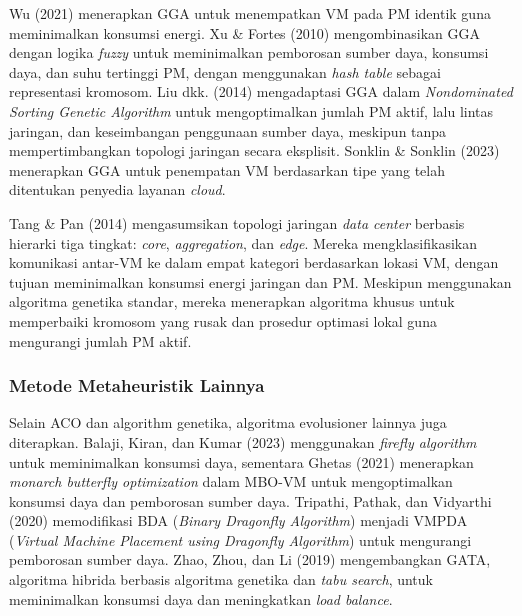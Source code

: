 Wu (2021) menerapkan GGA untuk menempatkan VM pada PM identik guna meminimalkan konsumsi energi. Xu & Fortes (2010) mengombinasikan GGA dengan logika \textit{fuzzy} untuk meminimalkan pemborosan sumber daya, konsumsi daya, dan suhu tertinggi PM, dengan menggunakan \textit{hash table} sebagai representasi kromosom. Liu dkk. (2014) mengadaptasi GGA dalam \textit{Nondominated Sorting Genetic Algorithm} untuk mengoptimalkan jumlah PM aktif, lalu lintas jaringan, dan keseimbangan penggunaan sumber daya, meskipun tanpa mempertimbangkan topologi jaringan secara eksplisit. Sonklin & Sonklin (2023) menerapkan GGA untuk penempatan VM berdasarkan tipe yang telah ditentukan penyedia layanan \textit{cloud}.

Tang & Pan (2014) mengasumsikan topologi jaringan \textit{data center} berbasis hierarki tiga tingkat: \textit{core}, \textit{aggregation}, dan \textit{edge}. Mereka mengklasifikasikan komunikasi antar-VM ke dalam empat kategori berdasarkan lokasi VM, dengan tujuan meminimalkan konsumsi energi jaringan dan PM. Meskipun menggunakan algoritma genetika standar, mereka menerapkan algoritma khusus untuk memperbaiki kromosom yang rusak dan prosedur optimasi lokal guna mengurangi jumlah PM aktif.

\subsubsection{Metode Metaheuristik Lainnya}
Selain ACO dan algorithm genetika, algoritma evolusioner lainnya juga diterapkan. Balaji, Kiran, dan Kumar (2023) menggunakan \textit{firefly algorithm} untuk meminimalkan konsumsi daya, sementara Ghetas (2021) menerapkan \textit{monarch butterfly optimization} dalam MBO-VM untuk mengoptimalkan konsumsi daya dan pemborosan sumber daya. Tripathi, Pathak, dan Vidyarthi (2020) memodifikasi BDA (\textit{Binary Dragonfly Algorithm}) menjadi VMPDA (\textit{Virtual Machine Placement using Dragonfly Algorithm}) untuk mengurangi pemborosan sumber daya. Zhao, Zhou, dan Li (2019) mengembangkan GATA, algoritma hibrida berbasis algoritma genetika dan \textit{tabu search}, untuk meminimalkan konsumsi daya dan meningkatkan \textit{load balance}.


